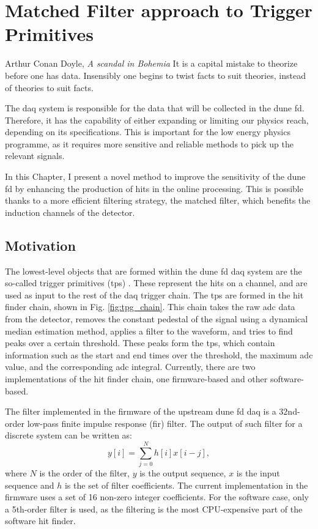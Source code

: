 \chapter{Matched Filter approach to Trigger Primitives}\label{chapter:matched_filter}

\begin{chapquote}{Arthur Conan Doyle, \textit{A scandal in Bohemia}}
	It is a capital mistake to theorize before one has data. Insensibly one begins to twist facts to suit theories, instead of theories to suit facts.
\end{chapquote}

The \gls{daq} system is responsible for the data that will be collected in the \gls{dune} \gls{fd}. Therefore, it has the capability of either expanding or limiting our physics reach, depending on its specifications. This is important for the low energy physics programme, as it requires more sensitive and reliable methods to pick up the relevant signals.

In this Chapter, I present a novel method to improve the sensitivity of the \gls{dune} \gls{fd} by enhancing the production of hits in the online processing. This is possible thanks to a more efficient filtering strategy, the matched filter, which benefits the induction channels of the detector.

\section{Motivation}
\label{sec:matched_filter_motivation}

The lowest-level objects that are formed within the \gls{dune} \gls{fd} \gls{daq} system are the so-called trigger primitives (\gls{tp}s) \cite{DUNEDAQ2022}. These represent the hits on a channel, and are used as input to the rest of the \gls{daq} trigger chain. The \gls{tp}s are formed in the hit finder chain, shown in Fig. \ref{fig:tpg_chain}. This chain takes the raw \gls{adc} data from the detector, removes the constant pedestal of the signal using a dynamical median estimation method, applies a filter to the waveform, and tries to find peaks over a certain threshold. These peaks form the \gls{tp}s, which contain information such as the start and end times over the threshold, the maximum \gls{adc} value, and the corresponding \gls{adc} integral. Currently, there are two implementations of the hit finder chain, one firmware-based and other software-based.

The filter implemented in the firmware of the upstream \gls{dune} \gls{fd} \gls{daq} is a $32$nd-order low-pass finite impulse response (\gls{fir}) filter. The output of such filter for a discrete system can be written as:
\begin{equation}\label{2.1.1}
	y[i] = \sum_{j=0}^{N} h[i] x[i-j],
\end{equation}
where $N$ is the order of the filter, $y$ is the output sequence, $x$ is the input sequence and $h$ is the set of filter coefficients. The current implementation in the firmware uses a set of 16 non-zero integer coefficients. For the software case, only a 5th-order filter is used, as the filtering is the most CPU-expensive part of the software hit finder.

